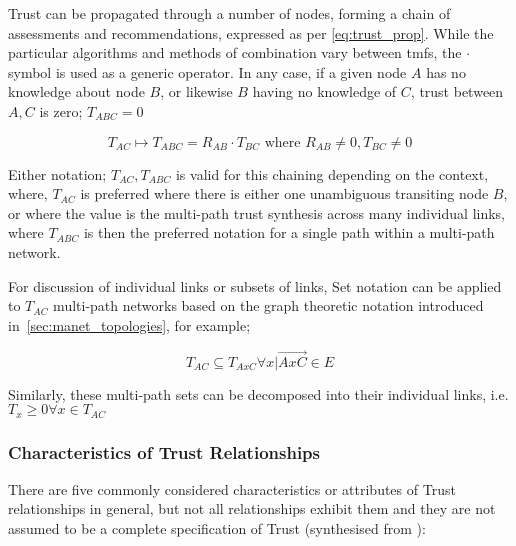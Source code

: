 Trust can be propagated through a number of nodes, forming a chain of assessments and recommendations, expressed as per \eqref{eq:trust_prop}.
While the particular algorithms and methods of combination vary between \glspl{tmf}, the $\cdot$ symbol is used as a generic operator.
In any case, if a given node $A$ has no knowledge about node $B$, or likewise $B$ having no knowledge of $C$, trust between $A,C$ is zero; $T_{ABC} = 0$

\begin{equation}
	\label{eq:trust_prop}
	T_ {AC}\mapsto T_{ABC} = R_{AB} \cdot T_{BC} \text{ where } R_{AB} \neq 0 , T_{BC} \neq 0
\end{equation}

Either notation; $T_{AC}, T_{ABC}$ is valid for this chaining depending on the context, where, $T_{AC}$ is preferred where there is either one unambiguous transiting node $B$, or where the value is the multi-path trust synthesis across many individual links, where $T_{ABC}$ is then the preferred notation for a single path within a multi-path network.

For discussion of individual links or subsets of links, Set notation can be applied to $T_{AC}$ multi-path networks based on the graph theoretic notation introduced in~\autoref{sec:manet_topologies}, for example;

\begin{equation}
	T_{AC} \subseteq T_{AxC} \forall x | \overrightarrow{AxC} \in E
\end{equation}

Similarly, these multi-path sets can be decomposed into their individual links, i.e. $T_x \ge 0 \forall x \in T_{AC}$
\subsubsection{Characteristics of Trust Relationships}

There are five commonly considered characteristics or attributes of Trust relationships in general, but not all relationships exhibit them and they are not assumed to be a complete specification of Trust (synthesised from \cite{Liu2006,Mayer1995, Mcknight1996, Pavan2015}):

